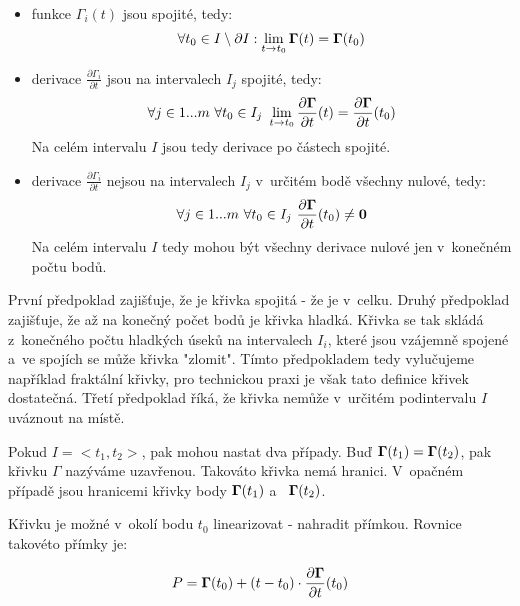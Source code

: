 \begin{itemize}

\item funkce \(\Gamma_i(t)\) jsou spojité, tedy:
\begin{equation}
\forall t_0 \in I \setminus \partial I: \lim_{t \to t_0} \boldsymbol{\Gamma}(t) = \boldsymbol{\Gamma}(t_0)
\end{equation}

\item derivace \(\frac{\partial \Gamma_i}{\partial t}\) jsou na intervalech \(I_j\) spojité, tedy:
\begin{equation}
\forall j \in 1...m \ \forall t_0 \in I_j \ \lim_{t \to t_0} \frac{\partial \vect{\Gamma}}{\partial t}(t) = \frac{\partial \vect{\Gamma}}{\partial t}(t_0)
\end{equation}
Na celém intervalu \(I\) jsou tedy derivace po částech spojité.

\item derivace \(\frac{\partial \Gamma_i}{\partial t}\) nejsou na intervalech \(I_j\) v~určitém bodě všechny nulové, tedy:
\begin{equation}
\forall j \in 1...m \ \forall t_0 \in I_j \ \frac{\partial \vect{\Gamma}}{\partial t}(t_0) \neq \vect{0}
\end{equation}
Na celém intervalu \(I\) tedy mohou být všechny derivace nulové jen v~konečném počtu bodů.

\end{itemize}

První předpoklad zajišťuje, že je křivka spojitá - že je v~celku. Druhý předpoklad zajišťuje, že až na konečný počet bodů je křivka hladká. Křivka se tak skládá z~konečného počtu hladkých úseků na intervalech \(I_i\), které jsou vzájemně spojené a~ve spojích se může křivka "zlomit". Tímto předpokladem tedy vylučujeme například fraktální křivky, pro technickou praxi je však tato definice křivek dostatečná. Třetí předpoklad říká, že křivka nemůže v~určitém podintervalu \(I\) uváznout na místě. 

Pokud \(I = <t_1, t_2>\), pak mohou nastat dva případy. Buď \(\boldsymbol{\Gamma}(t_1) = \boldsymbol{\Gamma}(t_2)\), pak křivku \(\Gamma\) nazýváme uzavřenou. Takováto křivka nemá hranici. V~opačném případě jsou hranicemi křivky body \(\boldsymbol{\Gamma}(t_1)\) a~ \(\boldsymbol{\Gamma}(t_2)\).

Křivku je možné v~okolí bodu \(t_0\) linearizovat - nahradit přímkou. Rovnice takovéto přímky je:

\begin{equation}
P = \boldsymbol{\Gamma}(t_0) + (t - t_0) \cdot \frac{\partial \boldsymbol{\Gamma}}{\partial t}(t_0)
\end{equation}

